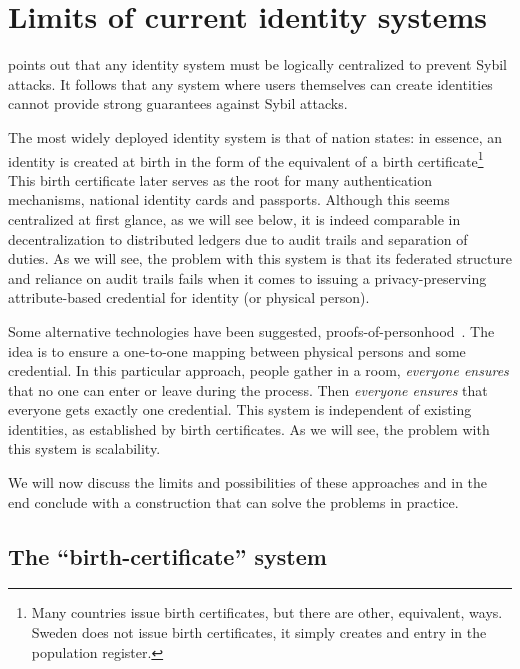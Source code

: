 \section{Limits of current identity systems}%
\label{identity-limits}

\Textcite{SybilAttack} points out that any identity system must be logically 
centralized to prevent Sybil attacks.
It follows that any system where users themselves can create identities cannot 
provide strong guarantees against Sybil attacks.

The most widely deployed identity system is that of nation states: in essence, 
an identity is created at birth in the form of the equivalent of a birth 
certificate\footnote{%
  Many countries issue birth certificates, but there are other, equivalent, 
  ways.
  \Eg Sweden does not issue birth certificates, it simply creates and entry in 
  the population register.
} This birth certificate later serves as the root for many authentication 
mechanisms, \eg national identity cards and passports.
Although this seems centralized at first glance, as we will see below, it is 
indeed comparable in decentralization to distributed ledgers due to audit 
trails and separation of duties.
As we will see, the problem with this system is that its federated structure 
and reliance on audit trails fails when it comes to issuing a 
privacy-preserving attribute-based credential for identity (or physical 
person).

Some alternative technologies have been suggested, \eg 
proofs-of-personhood~\cite{proof-of-personhood}.
The idea is to ensure a one-to-one mapping between physical persons and some 
credential.
In this particular approach, people gather in a room, \emph{everyone ensures} 
that no one can enter or leave during the process.
Then \emph{everyone ensures} that everyone gets exactly one credential.
This system is independent of existing identities, \eg as established by birth 
certificates.
As we will see, the problem with this system is scalability.

We will now discuss the limits and possibilities of these approaches and in the 
end conclude with a construction that can solve the problems in practice.


\subsection{The \enquote{birth-certificate} system}

